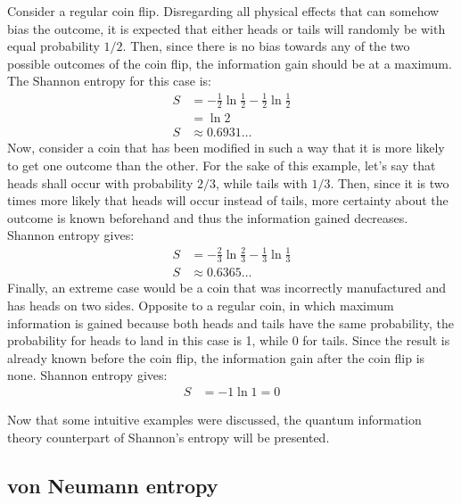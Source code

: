 	Consider a regular coin flip. Disregarding all physical effects that can somehow bias the outcome, it is expected that either heads or tails will randomly be with equal probability $1/2$. Then, since there is no bias towards any of the two possible outcomes of the coin flip, the information gain should be at a maximum. The Shannon entropy for this case is:
	\begin{align}
	S &= -\frac{1}{2} \ln{\frac{1}{2}} - \frac{1}{2} \ln{\frac{1}{2}}  \nonumber\\
	&= \ln{2}  \nonumber \\
	S &\approx 0.6931 \nonumber \dots
	\end{align}
	Now, consider a coin that has been modified in such a way that it is more likely to get one outcome than the other. For the sake of this example, let's say that heads shall occur with probability $2/3$, while tails with $1/3$. Then, since it is two times more likely that heads will occur instead of tails, more certainty about the outcome is known beforehand and thus the information gained decreases. Shannon entropy gives:
	\begin{align}
	S &= -\frac{2}{3} \ln{\frac{2}{3}} - \frac{1}{3} \ln{\frac{1}{3}} \nonumber \\
	S &\approx 0.6365 \dots \nonumber
	\end{align}
	Finally, an extreme case would be a coin that was incorrectly manufactured and has heads on two sides. Opposite to a regular coin, in which maximum information is gained because both heads and tails have the same probability, the probability for heads to land in this case is 1, while 0 for tails. Since the result is already known before the coin flip, the information gain after the coin flip is none. Shannon entropy gives:
	\begin{align}
	S &= -1\ln{1} = 0 \nonumber
	\end{align}

	Now that some intuitive examples were discussed, the quantum information theory counterpart of Shannon's entropy will be presented.
	
	\subsection{von Neumann entropy}
	
